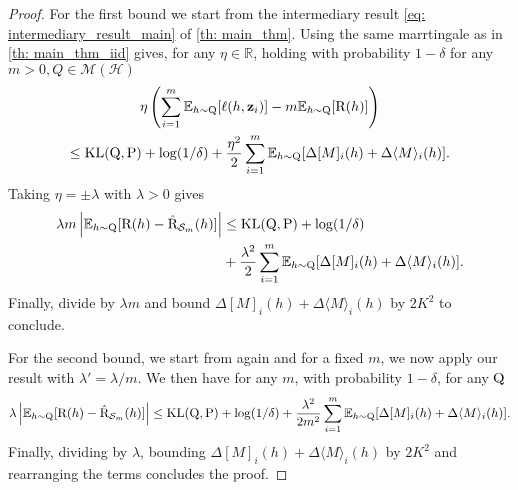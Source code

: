 \begin{proof}
For the first bound we start from the intermediary result \cref{eq: intermediary_result_main} of  \cref{th: main_thm}. Using the same marrtingale as in \cref{th: main_thm_iid} gives, for any $\eta\in\mathbb{R}$, holding with probability $1-\delta$ for any $m>0,Q\in\mathcal{M}(\mathcal{H})$
\begin{multline*}
\eta \left(\sum_{i=1}^m \mathbb{E}_{h\sim \mathrm{Q}}[\ell(h,\mathbf{z}_i)]  -m \mathbb{E}_{h\sim \mathrm{Q}}[ \text{R}(h) ] \right) \\
\leq  \operatorname{KL}(\mathrm{Q},\mathrm{P}) +\log(1/\delta) + \frac{\eta^2}{2}\sum_{i=1}^m \mathbb{E}_{h\sim \mathrm{Q}}[\Delta[M]_i(h) + \Delta \langle M\rangle_i(h) ].
\end{multline*}
Taking $\eta= \pm\lambda$ with $\lambda>0$ gives
\begin{align}
\label{eq: temp_result}
\lambda m\left | \mathbb{E}_{h\sim \mathrm{Q}}[ \text{R}(h) -\hat{\text{R}}_{\mathcal{S}_m}(h)] \right | & \leq \operatorname{KL}(\mathrm{Q},\mathrm{P}) +\log(1/\delta) \\
& + \frac{\lambda^2}{2}\sum_{i=1}^m \mathbb{E}_{h\sim \mathrm{Q}}[\Delta[M]_i(h) + \Delta \langle M\rangle_i(h) ].
\end{align}
Finally, divide by $\lambda m$ and bound $\Delta[M]_i(h) + \Delta \langle M\rangle_i(h)$ by $2K^2$ to conclude.


For the second bound, we start from  again and for a fixed $m$, we now apply our result with $\lambda'=\lambda/m$. We then have for any $m$, with probability $1-\delta$, for any $\mathrm{Q}$
\[ \lambda\left |  \mathbb{E}_{h\sim \mathrm{Q}}[ \text{R}(h) -\hat{\text{R}}_{\mathcal{S}_m}(h)] \right |  \leq \operatorname{KL}(\mathrm{Q},\mathrm{P}) +\log(1/\delta) + \frac{\lambda^2}{2m^2}\sum_{i=1}^m \mathbb{E}_{h\sim \mathrm{Q}}[\Delta[M]_i(h) + \Delta \langle M\rangle_i(h) ].\]
Finally, dividing by $\lambda$, bounding $\Delta[M]_i(h) + \Delta \langle M\rangle_i(h)$ by $2K^2$ and rearranging the terms concludes the proof.
\end{proof}


